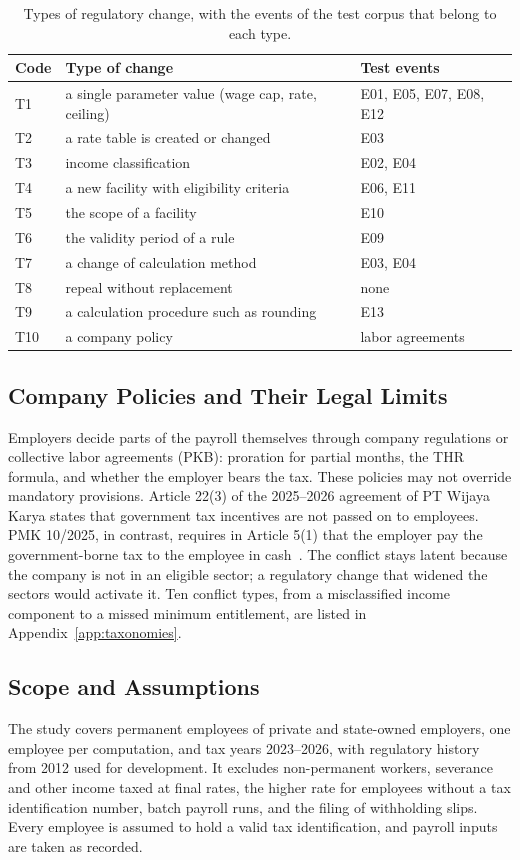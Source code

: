 \begin{table}[!t]
\caption{Types of regulatory change, with the events of the test corpus that belong to each type.}
\label{tab:types}
\centering\footnotesize
\setlength{\tabcolsep}{3pt}
\begin{tabularx}{\columnwidth}{@{}lLl@{}}
\toprule
Code & Type of change & Test events \\
\midrule
T1 & a single parameter value (wage cap, rate, ceiling) & E01, E05, E07, E08, E12 \\
T2 & a rate table is created or changed & E03 \\
T3 & income classification & E02, E04 \\
T4 & a new facility with eligibility criteria & E06, E11 \\
T5 & the scope of a facility & E10 \\
T6 & the validity period of a rule & E09 \\
T7 & a change of calculation method & E03, E04 \\
T8 & repeal without replacement & none \\
T9 & a calculation procedure such as rounding & E13 \\
T10 & a company policy & labor agreements \\
\bottomrule
\end{tabularx}
\end{table}

\subsection{Company Policies and Their Legal Limits}
\label{sec:policies}
Employers decide parts of the payroll themselves through company regulations or collective labor agreements (PKB): proration for partial months, the THR formula, and whether the employer bears the tax. These policies may not override mandatory provisions. Article 22(3) of the 2025--2026 agreement of PT Wijaya Karya states that government tax incentives are not passed on to employees. PMK 10/2025, in contrast, requires in Article 5(1) that the employer pay the government-borne tax to the employee in cash~\cite{pmk10_2025}. The conflict stays latent because the company is not in an eligible sector; a regulatory change that widened the sectors would activate it. Ten conflict types, from a misclassified income component to a missed minimum entitlement, are listed in Appendix~\ref{app:taxonomies}.

\subsection{Scope and Assumptions}
The study covers permanent employees of private and state-owned employers, one employee per computation, and tax years 2023--2026, with regulatory history from 2012 used for development. It excludes non-permanent workers, severance and other income taxed at final rates, the higher rate for employees without a tax identification number, batch payroll runs, and the filing of withholding slips. Every employee is assumed to hold a valid tax identification, and payroll inputs are taken as recorded.
